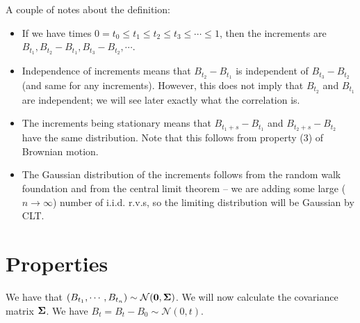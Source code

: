 A couple of notes about the definition: \begin{itemize}
	\item If we have times $0=t_0\leq t_1\leq t_2\leq t_3\leq \cdots\leq 1$, then the increments are $B_{t_1}, B_{t_2}-B_{t_1}, B_{t_3}-B_{t_2},\cdots$.
	\item Independence of increments means that $B_{t_2}-B_{t_1}$ is independent of $B_{t_3}-B_{t_2}$ (and same for any increments). However, this does not imply that $B_{t_2}$ and $B_{t_1}$ are independent; we will see later exactly what the correlation is.
	\item The increments being stationary means that $B_{t_1+s}-B_{t_1}$ and $B_{t_2+s}-B_{t_2}$ have the same distribution. Note that this follows from property (3) of Brownian motion.
	\item The Gaussian distribution of the increments follows from the random walk foundation and from the central limit theorem -- we are adding some large ($n\to\infty$) number of i.i.d. r.v.s, so the limiting distribution will be Gaussian by CLT.
\end{itemize}

\section{Properties}
We have that $(B_{t_1},\cdots,B_{t_n})\sim\mathcal N(\mathbf 0,\boldsymbol{\Sigma})$. We will now calculate the covariance matrix $\boldsymbol{\Sigma}$. We have $B_t=B_t-B_0\sim\mathcal N(0,t)$.

